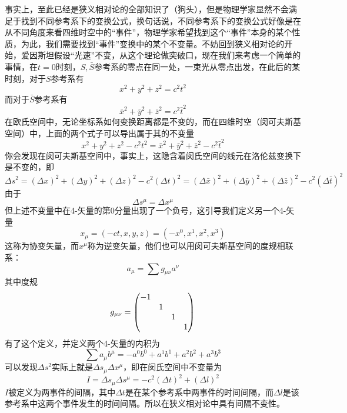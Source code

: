 \documentclass[14pt,oneside]{book}
\begin{document}
\begin{large}
事实上，至此已经是狭义相对论的全部知识了（狗头），但是物理学家显然不会满足于找到不同参考系下的变换公式，换句话说，不同参考系下的变换公式好像是在从不同角度来看四维时空中的“事件”，物理学家希望找到这个“事件”本身的某个性质，为此，我们需要找到“事件”变换中的某个不变量。不妨回到狭义相对论的开始，爱因斯坦假设“光速”不变，从这个理论做突破口，现在我们来考虑一个简单的事情，在$t=0$时刻，$S,\bar S$参考系的零点在同一处，一束光从零点出发，在此后的某时刻，对于$S$参考系有
\begin{equation}
  x^2+y^2+z^2=c^2t^2
\end{equation}
而对于$\bar S$参考系有
\begin{equation}
  \bar x^2+\bar y^2+\bar z^2=c^2\bar t^2
\end{equation}
在欧氏空间中，无论坐标系如何变换距离都是不变的，而在四维时空（闵可夫斯基空间）中，上面的两个式子可以导出属于其的不变量
\begin{equation}
  x^2+y^2+z^2-c^2t^2=\bar x^2+\bar y^2+\bar z^2-c^2\bar t^2
\end{equation}
你会发现在闵可夫斯基空间中，事实上，这隐含着闵氏空间的线元在洛伦兹变换下是不变的，即
\begin{equation}
  \Delta s^2= (\Delta x)^2+(\Delta y)^2+(\Delta z)^2-c^2(\Delta t)^2=(\Delta \bar x)^2+(\Delta\bar y)^2+(\Delta\bar z)^2-c^2(\Delta \bar t)^2
\end{equation}
由于
\begin{equation}
  \Delta s^\mu=\Delta x^\mu
\end{equation}
但上述不变量中在4-矢量的第0分量出现了一个负号，这引导我们定义另一个4-矢量
\begin{equation}
  x_\mu=(-ct,x,y,z)=(-x^0,x^1,x^2,x^3)
\end{equation}
这称为协变矢量，而$x^\mu$称为逆变矢量，他们也可以用闵可夫斯基空间的度规相联系：
\begin{equation}
  a_\mu=\sum g_{\mu\nu}a^\nu
\end{equation}
其中度规
\begin{equation}
  g_{\mu\nu}=\mqty(\dmat{-1,1,1,1})
\end{equation}
有了这个定义，并定义两个4-矢量的内积为
\begin{equation}
  \sum a_\mu b^\mu=-a^0b^0+a^1b^1+a^2b^2+a^3b^3
\end{equation}
可以发现$\Delta s^2$实际上就是$\Delta s_\mu\Delta x^\mu$，即在闵氏空间中不变量为
\begin{equation}
  I=\Delta s_\mu\Delta s^\mu=-c^2(\Delta t)^2+(\Delta l)^2
\end{equation}
$I$被定义为两事件的间隔，其中$\Delta t$是在某个参考系中两事件的时间间隔，而$\Delta l$是该参考系中这两个事件发生的时间间隔。所以在狭义相对论中具有间隔不变性。


\end{large}
\end{document}

